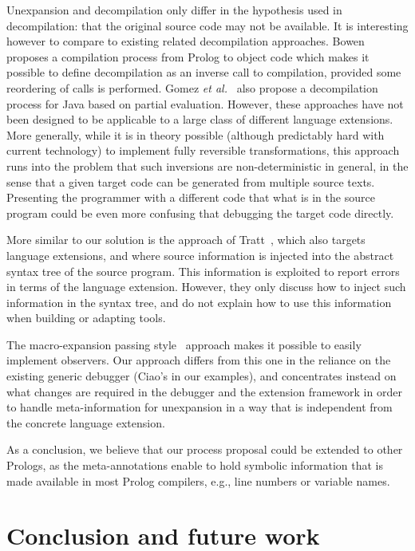 \documentclass[preprint]{llncs}
\begin{document}
{Unexpansion and decompilation only differ in the hypothesis used in
decompilation: that the original source code may not be available. It
is interesting however to compare to existing related decompilation
approaches. Bowen~\cite{decompilationprolog} proposes a compilation
process from Prolog to object code which makes it possible to define
decompilation as an inverse call to compilation, provided some
reordering of calls is performed. Gomez \emph{et
  al.}~\cite{mod-decomp-jist09} also propose a decompilation process for
Java based on partial evaluation. However, these approaches have not
been designed to be applicable to a large class of different language
extensions.  More generally, while it is in theory possible (although
predictably hard with current technology) to implement fully
reversible transformations, this approach runs into the problem that
such inversions are non-deterministic in general, in the sense that a
given target code can be generated from multiple source texts.
Presenting the programmer with a different code that what is in the
source program could be even more confusing that debugging the target
code directly.

More similar to our solution is the approach of Tratt~\cite{tratt08},
which also targets language extensions, and where source information
is injected into the abstract syntax tree of the source program. This
information is exploited to report errors in terms of the language
extension. However, they only discuss how to inject such information
in the syntax tree, and do not explain how to use this information
when building or adapting tools.

The macro-expansion passing style~\cite{dybvigEPS} approach makes it
possible to easily implement observers. Our approach differs from this
one in the reliance on the existing generic debugger (Ciao's in our
examples), and concentrates instead on what changes are required in
the debugger and the extension framework in order to handle
meta-information for unexpansion in a way that is independent from
the concrete language extension.

As a conclusion, we believe that our process proposal could be
extended to other Prologs, as the meta-annotations enable to
hold symbolic information that is made available in most Prolog compilers,
e.g., line numbers or variable names.



\section{Conclusion and future work}
\label{sec:conclusions}

}
\end{document}
